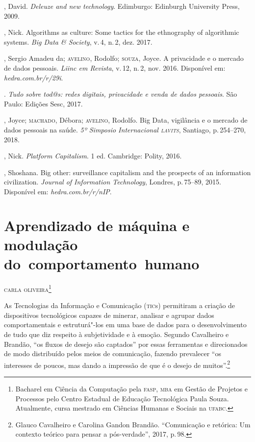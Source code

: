 \begin{bibliohedra}
, David. \textit{Deleuze and new technology}. Edimburgo: Edinburgh
University Press, 2009.

, Nick. Algorithms as culture: Some tactics for the
ethnography of algorithmic systems. \textit{Big Data \& Society}, v.\,4, n.\,2, dez. 2017.

, Sergio Amadeu da; \textsc{avelino}, Rodolfo; \textsc{souza}, Joyce. A privacidade e o mercado de dados pessoais. \textit{Liinc em Revista}, v.\,12, n.\,2, nov. 2016. Disponível em: \textit{hedra.com.br/r/29i}.

\titidem. \textit{Tudo sobre tod@s: redes digitais,
privacidade e venda de dados pessoais}. São Paulo: Edições Sesc, 2017.

, Joyce; \textsc{machado}, Débora; \textsc{avelino}, Rodolfo. Big Data, vigilância e o mercado de dados pessoais na saúde. \textit{5º Simposio Internacional \textsc{lavits}}, Santiago, p.\,254--270, 2018.

, Nick. \textit{Platform Capitalism}. 1 ed. Cambridge: Polity, 2016.

, Shoshana. Big other: surveillance capitalism and the
prospects of an information civilization. \textit{Journal of
Information Technology}, Londres, p.\,75--89, 2015. Disponível em: \textit{hedra.com.br/r/nIP}.
\end{bibliohedra}


\chapter{Aprendizado de máquina e modulação do~comportamento~humano}


\begin{flushright}
\textsc{carla oliveira\footnote{Bacharel em Ciência da Computação pela \textsc{fasp}, \textsc{mba} em Gestão de Projetos e Processos pelo Centro Estadual de Educação Tecnológica Paula Souza. Atualmente, cursa mestrado em Ciências Humanas e Sociais na \textsc{ufabc}.}}
\end{flushright}

\noindent{}As Tecnologias da Informação e Comunicação (\textsc{tic}s) permitiram a criação
de dispositivos tecnológicos capazes de minerar, analisar e agrupar
dados comportamentais e estruturá"-los em uma base de dados para o
desenvolvimento de tudo que diz respeito à subjetividade e à emoção.
Segundo Cavalheiro e Brandão, ``os fluxos de desejo são captados''
por essas ferramentas e direcionados de modo distribuído pelos meios de
comunicação, fazendo prevalecer ``os interesses de poucos, mas dando a
impressão de que é o desejo de muitos''.\footnote{Glauco Cavalheiro e Carolina Gandon Brandão. ``Comunicação e
retórica: Um contexto teórico para pensar a pós-verdade'', 2017, p.\,98.}

